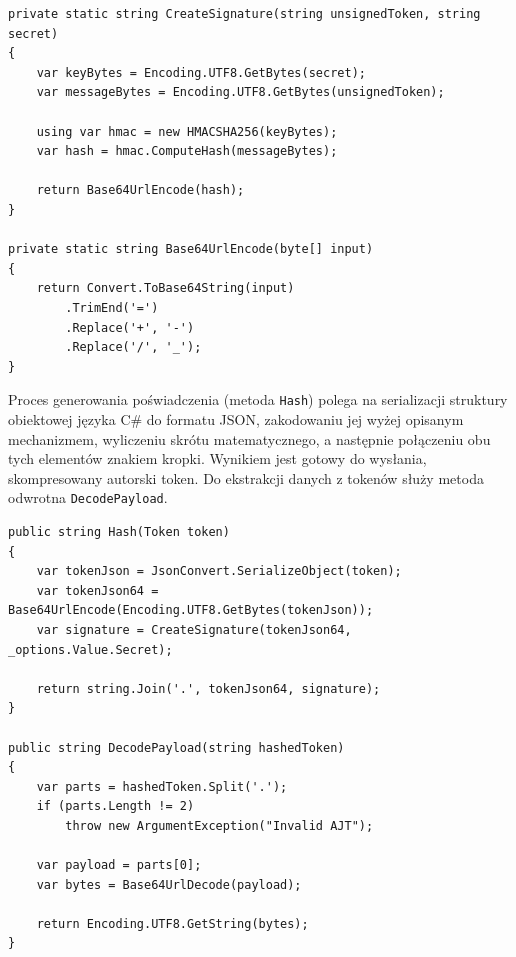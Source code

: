 \documentclass{SGGW-thesis}
\begin{document}
\vspace{2cm}

\begin{minipage}{\textwidth}
\begin{lstlisting}    
private static string CreateSignature(string unsignedToken, string secret)
{
    var keyBytes = Encoding.UTF8.GetBytes(secret);
    var messageBytes = Encoding.UTF8.GetBytes(unsignedToken);

    using var hmac = new HMACSHA256(keyBytes);
    var hash = hmac.ComputeHash(messageBytes);
    
    return Base64UrlEncode(hash);
}

private static string Base64UrlEncode(byte[] input)
{
    return Convert.ToBase64String(input)
        .TrimEnd('=')
        .Replace('+', '-')
        .Replace('/', '_');
}
\end{lstlisting}
\end{minipage}

\clearpage

Proces generowania poświadczenia (metoda \texttt{Hash}) polega na serializacji struktury obiektowej języka C\# do formatu JSON, zakodowaniu jej wyżej opisanym mechanizmem, wyliczeniu skrótu matematycznego, a następnie połączeniu obu tych elementów znakiem kropki. Wynikiem jest gotowy do wysłania, skompresowany autorski token. Do ekstrakcji danych z tokenów służy metoda odwrotna \texttt{DecodePayload}.

\vspace{2cm}

\begin{minipage}{\textwidth}
\begin{lstlisting}
public string Hash(Token token)
{
    var tokenJson = JsonConvert.SerializeObject(token);
    var tokenJson64 = Base64UrlEncode(Encoding.UTF8.GetBytes(tokenJson));
    var signature = CreateSignature(tokenJson64, _options.Value.Secret);
    
    return string.Join('.', tokenJson64, signature);
}

public string DecodePayload(string hashedToken)
{
    var parts = hashedToken.Split('.');
    if (parts.Length != 2)
        throw new ArgumentException("Invalid AJT");

    var payload = parts[0];
    var bytes = Base64UrlDecode(payload);
    
    return Encoding.UTF8.GetString(bytes);
}
\end{lstlisting}
\end{minipage}
\end{document}
